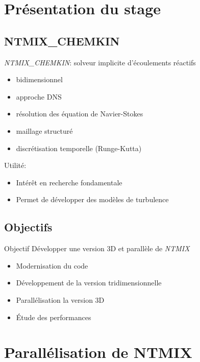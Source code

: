 \documentclass{beamer}
\begin{document}
%
%
\section{Présentation du stage}
\subsection{NTMIX\_CHEMKIN}
\begin{frame}
  \textit{NTMIX\_CHEMKIN}: solveur implicite d'écoulements réactifs
  \begin{itemize}
  \item bidimensionnel
  \item approche DNS
  \item résolution des équation de Navier-Stokes
  \item maillage structuré
  \item discrétisation temporelle (Runge-Kutta)
  \end{itemize}
  
  \vfill
  Utilité:
  \begin{itemize}
  \item Intérêt en recherche fondamentale
  \item Permet de développer des modèles de turbulence
  \end{itemize}
\end{frame}


\subsection{Objectifs}
\begin{frame}

  \begin{block}{Objectif}
    Développer une version 3D et parallèle de \textit{NTMIX}
  \end{block}
  \begin{itemize}
  \item Modernisation du code
  \item Développement de la version tridimensionnelle
  \item Parallélisation la version 3D
  \item Étude des performances
  \end{itemize} 
\end{frame}


%
%

\section{Parallélisation de NTMIX}
\end{document}
